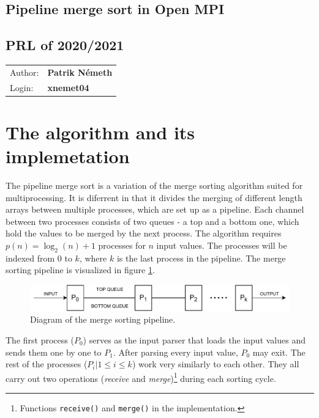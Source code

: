 \documentclass[pdftex, 11pt, a4paper, titlepage]{article}
\begin{document}
    \begin{center}
        \section*{Pipeline merge sort in Open MPI}
        \subsection*{PRL of 2020/2021}
        \begin{tabular}{ l l }
            Author: & \textbf{Patrik Németh} \\
            Login: & \textbf{xnemet04}
        \end{tabular}
    \end{center}
    \section{The algorithm and its implemetation}
        The pipeline merge sort is a variation of the merge sorting algorithm suited for multiprocessing.
        It is diferrent in that it divides the merging of different length arrays between multiple processes,
        which are set up as a pipeline. Each channel between two processes consists of two queues - a top and a bottom
        one, which hold the values to be merged by the next process. The algorithm requires $p(n) = \log_{2}(n)+1$ processes
        for $n$ input values. The processes will be indexed from $0$ to $k$, where $k$ is the last process in the pipeline.
        The merge sorting pipeline is visualized in figure \ref{pms_diagram}.

        \begin{figure}[h]
            \centering
            \includegraphics[scale=0.8]{pms_diagram.pdf}
            \caption{Diagram of the merge sorting pipeline.}
            \label{pms_diagram}
        \end{figure}

        The first process ($P_0$) serves as the input parser that loads the input values and sends them one by
        one to $P_1$. After parsing every input value, $P_0$ may exit. The rest of the processes
        ($P_i | 1\leq{}i\leq{}k$) work very similarly to each other. They all carry out two operations (\emph{receive}
        and \emph{merge})\footnote{Functions \texttt{receive()} and \texttt{merge()} in the implementation.} during each
        sorting cycle.
\end{document}

